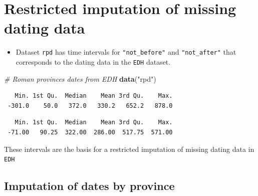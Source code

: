 \documentclass[a4paper,11pt]{memoir}
\newenvironment{Shaded}{\begin{snugshade}}{\end{snugshade}}
\newcommand{\CommentTok}[1]{\textcolor[rgb]{0.56,0.35,0.01}{\textit{#1}}}
\newcommand{\KeywordTok}[1]{\textcolor[rgb]{0.13,0.29,0.53}{\textbf{#1}}}
\newcommand{\NormalTok}[1]{#1}
\newcommand{\OperatorTok}[1]{\textcolor[rgb]{0.81,0.36,0.00}{\textbf{#1}}}
\newcommand{\StringTok}[1]{\textcolor[rgb]{0.31,0.60,0.02}{#1}}
\providecommand{\tightlist}{%
  \setlength{\itemsep}{0pt}\setlength{\parskip}{0pt}}
\begin{document}
\hypertarget{restricted-imputation-of-missing-dating-data}{%
\section{Restricted imputation of missing dating
data}\label{restricted-imputation-of-missing-dating-data}}

\begin{itemize}
\tightlist
\item
  Dataset \texttt{rpd} has time intervals for \texttt{"not\_before"} and
  \texttt{"not\_after"} that corresponds to the dating data in the
  \texttt{EDH} dataset.
\end{itemize}

\begin{Shaded}
\begin{Highlighting}[]
\CommentTok{# Roman provinces dates from EDH}
\KeywordTok{data}\NormalTok{(}\StringTok{"rpd"}\NormalTok{)}
\end{Highlighting}
\end{Shaded}

\begin{Shaded}
\end{Shaded}

\begin{verbatim}
   Min. 1st Qu.  Median    Mean 3rd Qu.    Max. 
 -301.0    50.0   372.0   330.2   652.2   878.0 
\end{verbatim}

\begin{Shaded}
\end{Shaded}

\begin{verbatim}
   Min. 1st Qu.  Median    Mean 3rd Qu.    Max. 
 -71.00   90.25  322.00  286.00  517.75  571.00 
\end{verbatim}

These intervals are the basis for a restricted imputation of missing
dating data in \texttt{EDH}

\hypertarget{imputation-of-dates-by-province}{%
\subsection{Imputation of dates by
province}\label{imputation-of-dates-by-province}}
\end{document}
